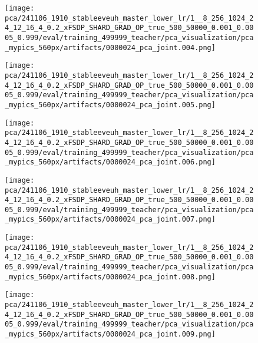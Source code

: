 \begin{figure*}[p]
\begin{subfigure}[t]{0.097\textwidth}
    \end{subfigure}\hfill
    \begin{subfigure}[t]{0.097\textwidth}
        \centering
        \texttt{[image: pca/241106\_1910\_stableeveuh\_master\_lower\_lr/1\_\_8\_256\_1024\_24\_12\_16\_4\_0.2\_xFSDP\_SHARD\_GRAD\_OP\_true\_500\_50000\_0.001\_0.0005\_0.999/eval/training\_499999\_teacher/pca\_visualization/pca\_mypics\_560px/artifacts/0000024\_pca\_joint.004.png]}
    \end{subfigure}\hfill
    \begin{subfigure}[t]{0.097\textwidth}
        \centering
        \texttt{[image: pca/241106\_1910\_stableeveuh\_master\_lower\_lr/1\_\_8\_256\_1024\_24\_12\_16\_4\_0.2\_xFSDP\_SHARD\_GRAD\_OP\_true\_500\_50000\_0.001\_0.0005\_0.999/eval/training\_499999\_teacher/pca\_visualization/pca\_mypics\_560px/artifacts/0000024\_pca\_joint.005.png]}
    \end{subfigure}\hfill
    \begin{subfigure}[t]{0.097\textwidth}
        \centering
        \texttt{[image: pca/241106\_1910\_stableeveuh\_master\_lower\_lr/1\_\_8\_256\_1024\_24\_12\_16\_4\_0.2\_xFSDP\_SHARD\_GRAD\_OP\_true\_500\_50000\_0.001\_0.0005\_0.999/eval/training\_499999\_teacher/pca\_visualization/pca\_mypics\_560px/artifacts/0000024\_pca\_joint.006.png]}
    \end{subfigure}\hfill
    \begin{subfigure}[t]{0.097\textwidth}
        \centering
        \texttt{[image: pca/241106\_1910\_stableeveuh\_master\_lower\_lr/1\_\_8\_256\_1024\_24\_12\_16\_4\_0.2\_xFSDP\_SHARD\_GRAD\_OP\_true\_500\_50000\_0.001\_0.0005\_0.999/eval/training\_499999\_teacher/pca\_visualization/pca\_mypics\_560px/artifacts/0000024\_pca\_joint.007.png]}
    \end{subfigure}\hfill
    \begin{subfigure}[t]{0.097\textwidth}
        \centering
        \texttt{[image: pca/241106\_1910\_stableeveuh\_master\_lower\_lr/1\_\_8\_256\_1024\_24\_12\_16\_4\_0.2\_xFSDP\_SHARD\_GRAD\_OP\_true\_500\_50000\_0.001\_0.0005\_0.999/eval/training\_499999\_teacher/pca\_visualization/pca\_mypics\_560px/artifacts/0000024\_pca\_joint.008.png]}
    \end{subfigure}\hfill
    \begin{subfigure}[t]{0.097\textwidth}
        \centering
        \texttt{[image: pca/241106\_1910\_stableeveuh\_master\_lower\_lr/1\_\_8\_256\_1024\_24\_12\_16\_4\_0.2\_xFSDP\_SHARD\_GRAD\_OP\_true\_500\_50000\_0.001\_0.0005\_0.999/eval/training\_499999\_teacher/pca\_visualization/pca\_mypics\_560px/artifacts/0000024\_pca\_joint.009.png]}

\end{subfigure}
\end{figure*}

